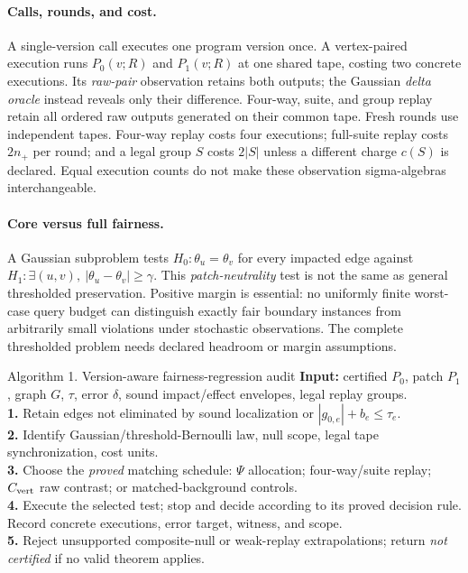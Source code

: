 \paragraph{Calls, rounds, and cost.} A single-version call executes one program version once. A vertex-paired execution runs $P_0(v;R)$ and $P_1(v;R)$ at one shared tape, costing two concrete executions. Its \emph{raw-pair} observation retains both outputs; the Gaussian \emph{delta oracle} instead reveals only their difference. Four-way, suite, and group replay retain all ordered raw outputs generated on their common tape. Fresh rounds use independent tapes. Four-way replay costs four executions; full-suite replay costs $2n_+$ per round; and a legal group $S$ costs $2|S|$ unless a different charge $c(S)$ is declared. Equal execution counts do not make these observation sigma-algebras interchangeable.

\paragraph{Core versus full fairness.} A Gaussian subproblem tests $H_0:\theta_u=\theta_v$ for every impacted edge against $H_1:\exists(u,v),\ |\theta_u-\theta_v|\ge\gamma$. This \emph{patch-neutrality} test is not the same as general thresholded preservation. Positive margin is essential: no uniformly finite worst-case query budget can distinguish exactly fair boundary instances from arbitrarily small violations under stochastic observations. The complete thresholded problem needs declared headroom or margin assumptions.

\begin{researchalgorithm}{Algorithm 1. Version-aware fairness-regression audit}\label{alg:audit}
\textbf{Input:} certified $P_0$, patch $P_1$, graph $G$, $\tau$, error $\delta$, sound impact/effect envelopes, legal replay groups.\\
\textbf{1.} Retain edges not eliminated by sound localization or $|g_{0,e}|+b_e\le\tau_e$.\\
\textbf{2.} Identify Gaussian/threshold-Bernoulli law, null scope, legal tape synchronization, cost units.\\
\textbf{3.} Choose the \emph{proved} matching schedule: $\Psi$ allocation; four-way/suite replay; $C_{\rm vert}$ raw contrast; or matched-background controls.\\
\textbf{4.} Execute the selected test; stop and decide according to its proved decision rule. Record concrete executions, error target, witness, and scope.\\
\textbf{5.} Reject unsupported composite-null or weak-replay extrapolations; return \emph{not certified} if no valid theorem applies.
\end{researchalgorithm}

